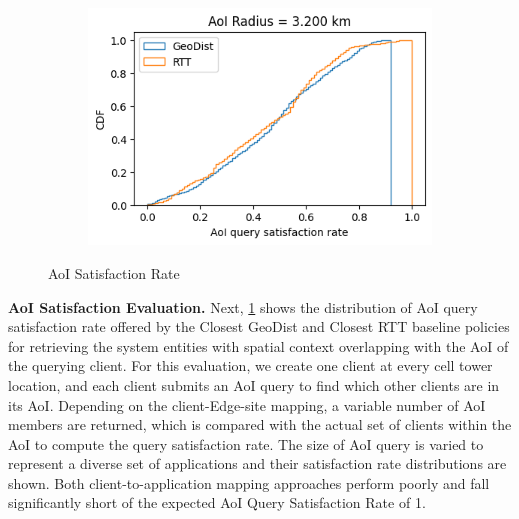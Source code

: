 \begin{figure}
\begin{subfigure}{0.333\textwidth}
  \caption{}
\end{subfigure}%
\begin{subfigure}{0.333\textwidth}
  \centering
  \includegraphics[width=\linewidth]{figures/mechanisms/spatial_ctx_mgmt/aoi_satisfaction_rate_cdf_AOI_3.200_km.png}
  \caption{}
\end{subfigure}
\caption{AoI Satisfaction Rate }
\label{fig:aoi_satisfaction_rate_eval}
\end{figure}

\par \noindent \textbf{AoI Satisfaction Evaluation.} Next, \cref{fig:aoi_satisfaction_rate_eval} shows the distribution of AoI query satisfaction rate offered by the Closest GeoDist and Closest RTT baseline policies for retrieving the system entities with spatial context overlapping with the AoI of the querying client. For this evaluation, we create one client at every cell tower location, and each client submits an AoI query to find which other clients are in its AoI. Depending on the client-Edge-site mapping, a variable number of AoI members are returned, which is compared with the actual set of clients within the AoI to compute the query satisfaction rate. The size of AoI query is varied to represent a diverse set of applications and their satisfaction rate distributions are shown. Both client-to-application mapping approaches perform poorly and fall significantly short of the expected AoI Query Satisfaction Rate of 1.

